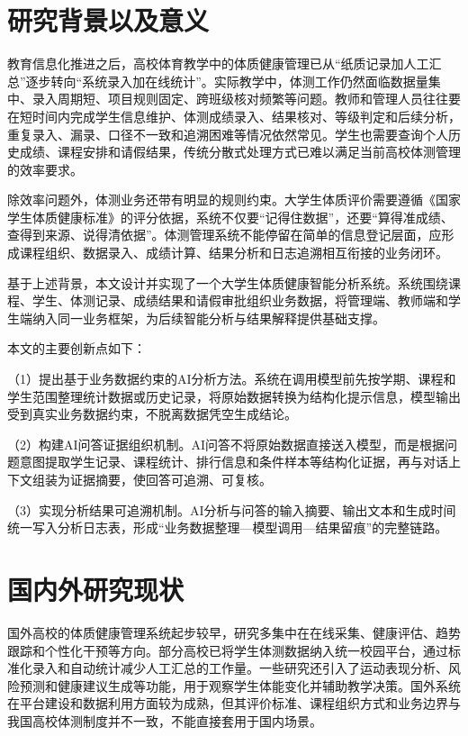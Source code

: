 
\section{研究背景以及意义}

教育信息化推进之后，高校体育教学中的体质健康管理已从“纸质记录加人工汇总”逐步转向“系统录入加在线统计”。实际教学中，体测工作仍然面临数据量集中、录入周期短、项目规则固定、跨班级核对频繁等问题。教师和管理人员往往要在短时间内完成学生信息维护、体测成绩录入、结果核对、等级判定和后续分析，重复录入、漏录、口径不一致和追溯困难等情况依然常见。学生也需要查询个人历史成绩、课程安排和请假结果，传统分散式处理方式已难以满足当前高校体测管理的效率要求。

除效率问题外，体测业务还带有明显的规则约束。大学生体质评价需要遵循《国家学生体质健康标准》的评分依据\cite{national2014fitness}，系统不仅要“记得住数据”，还要“算得准成绩、查得到来源、说得清依据”。体测管理系统不能停留在简单的信息登记层面，应形成课程组织、数据录入、成绩计算、结果分析和日志追溯相互衔接的业务闭环。

基于上述背景，本文设计并实现了一个大学生体质健康智能分析系统。系统围绕课程、学生、体测记录、成绩结果和请假审批组织业务数据，将管理端、教师端和学生端纳入同一业务框架，为后续智能分析与结果解释提供基础支撑。

本文的主要创新点如下：

（1）提出基于业务数据约束的AI分析方法。系统在调用模型前先按学期、课程和学生范围整理统计数据或历史记录，将原始数据转换为结构化提示信息，模型输出受到真实业务数据约束，不脱离数据凭空生成结论。

（2）构建AI问答证据组织机制。AI问答不将原始数据直接送入模型，而是根据问题意图提取学生记录、课程统计、排行信息和条件样本等结构化证据，再与对话上下文组装为证据摘要，使回答可追溯、可复核。

（3）实现分析结果可追溯机制。AI分析与问答的输入摘要、输出文本和生成时间统一写入分析日志表，形成“业务数据整理—模型调用—结果留痕”的完整链路。

\section{国内外研究现状}

国外高校的体质健康管理系统起步较早，研究多集中在在线采集、健康评估、趋势跟踪和个性化干预等方向。部分高校已将学生体测数据纳入统一校园平台，通过标准化录入和自动统计减少人工汇总的工作量。一些研究还引入了运动表现分析、风险预测和健康建议生成等功能，用于观察学生体能变化并辅助教学决策。国外系统在平台建设和数据利用方面较为成熟，但其评价标准、课程组织方式和业务边界与我国高校体测制度并不一致，不能直接套用于国内场景。

